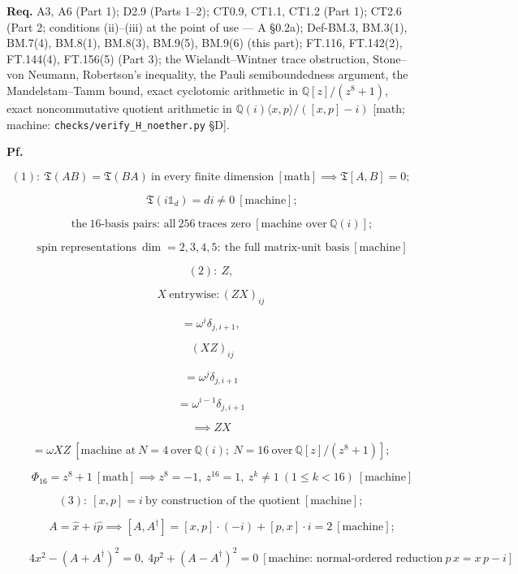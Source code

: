 \documentclass[11pt,openany]{report}
\theoremstyle{canonplain}
\theoremstyle{canondef}
\begin{document}
\textbf{Req.} A3, A6 (Part 1); D2.9 (Parts 1–2); CT0.9, CT1.1, CT1.2 (Part 1); CT2.6 (Part 2; conditions (ii)–(iii) at the point of use — A §0.2a); Def-BM.3, BM.3(1), BM.7(4), BM.8(1), BM.8(3), BM.9(5), BM.9(6) (this part); FT.116, FT.142(2), FT.144(4), FT.156(5) (Part 3); the Wielandt–Wintner trace obstruction, Stone–von Neumann, Robertson's inequality, the Pauli semiboundedness argument, the Mandelstam–Tamm bound, exact cyclotomic arithmetic in $\mathbb Q[z]/(z^8{+}1)$, exact noncommutative quotient arithmetic in $\mathbb Q(i)\langle x,p\rangle/([x,p]-i)$ [math; machine: \texttt{checks/\allowbreak{}verify\_\allowbreak{}H\_\allowbreak{}noether.py} §D].

\textbf{Pf.}

\[
(1):\ \mathfrak T(AB)=\mathfrak T(BA)\ \text{in every finite dimension}\ [\text{math}]\implies\mathfrak T[A,B]=0;
\]

\[
\qquad \mathfrak T(i\mathbb1_d)=di\ne0\ [\text{machine}];
\]

\[
\qquad \text{the}\ 16\text{-basis pairs: all}\ 256\ \text{traces zero}\ [\text{machine over}\ \mathbb Q(i)];
\]

\[
\qquad \text{spin representations}\ \dim=2,3,4,5:\ \text{the full matrix-unit basis}\ [\text{machine}]
\]

\[
(2):\ Z,
\]

\[
X\ \text{entrywise}: (ZX)_{ij}
\]

\[
= \omega^{i}\delta_{j,i+1},
\]

\[
\ (XZ)_{ij}
\]

\[
= \omega^{j}\delta_{j,i+1}
\]

\[
= \omega^{i-1}\delta_{j,i+1}
\]

\[
\implies ZX
\]

\[
= \omega XZ\ [\text{machine at}\ N=4\ \text{over}\ \mathbb Q(i);\ N=16\ \text{over}\ \mathbb Q[z]/(z^8{+}1)];
\]

\[
\qquad \Phi_{16}=z^8+1\ [\text{math}]\implies z^8=-1,\ z^{16}=1,\ z^k\ne1\ (1\le k<16)\ [\text{machine}]
\]

\[
(3):\ [x,p]=i\ \text{by construction of the quotient}\ [\text{machine}];
\]

\[
\qquad A=\hat x+i\hat p\implies[A,A^\dagger]=[x,p]\cdot(-i)+[p,x]\cdot i=2\ [\text{machine}];
\]

\[
\qquad 4x^2-(A+A^\dagger)^2=0,\ 4p^2+(A-A^\dagger)^2=0\ [\text{machine: normal-ordered reduction}\ p\,x=x\,p-i]
\]
\end{document}
